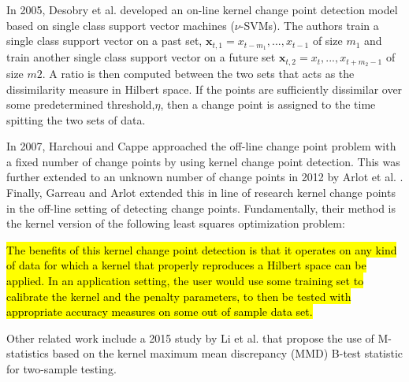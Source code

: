 In 2005, Desobry et al. \cite{desobry2005online} developed an on-line kernel change point detection model based on single class support vector machines ($\nu$-SVMs). The authors train a single class support vector on a past set, $\mathbf{x}_{t,1}={x_{t-m_1},...,x_{t-1}}$ of size $m_1$ and train another single class support vector on a future set $\mathbf{x}_{t,2}={x_t,...,x_{t+m_2-1}}$ of size $m2$. A ratio is then computed between the two sets that acts as the dissimilarity measure in Hilbert space. If the points are sufficiently dissimilar over some predetermined threshold,$\eta$, then a change point is assigned to the time spitting the two sets of data.%

In 2007, Harchoui and Cappe \cite{harchaoui2007retrospective} approached the off-line change point problem with a fixed number of change points by using kernel change point detection. This was further extended to an unknown number of change points in 2012 by Arlot et al. \cite{arlot2012kernel}. Finally, Garreau and Arlot extended this in line of research kernel change points in the off-line setting of detecting change points. Fundamentally, their method is the kernel version of the following least squares optimization problem:


\hl{The benefits of this kernel change point detection is that it operates on any kind of data for which a kernel that properly reproduces a Hilbert space can be applied.  %
In an application setting, the user would use some training set to calibrate the kernel and the penalty parameters, to then be tested with appropriate accuracy measures on some out of sample data set.}


Other related work include a 2015 study by Li et al. \cite{li2015m} that propose the use of M-statistics based on the kernel maximum mean discrepancy (MMD) B-test statistic for two-sample testing.


